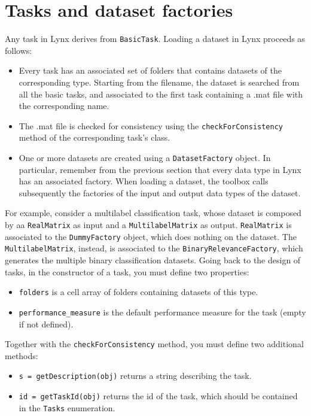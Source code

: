 \section{Tasks and dataset factories}

Any task in Lynx derives from \verb|BasicTask|. Loading a dataset in Lynx proceeds as follows:

\begin{itemize}
\item Every task has an associated set of folders that contains datasets of the corresponding type. Starting from the filename, the dataset is searched from all the basic tasks, and associated to the first task containing a .mat file with the corresponding name.
\item The .mat file is checked for consistency using the \verb|checkForConsistency| method of the corresponding task's class.
\item One or more datasets are created using a \verb|DatasetFactory| object. In particular, remember from the previous section that every data type in Lynx has an associated factory. When loading a dataset, the toolbox calls subsequently the factories of the input and output data types of the dataset.
\end{itemize}

\noindent For example, consider a multilabel classification task, whose dataset is composed by aa \verb|RealMatrix| as input and a \verb|MultilabelMatrix| as output. \verb|RealMatrix| is associated to the \verb|DummyFactory| object, which does nothing on the dataset. The \verb|MultilabelMatrix|, instead, is associated to the \verb|BinaryRelevanceFactory|, which generates the multiple binary classification datasets. Going back to the design of tasks, in the constructor of a task, you must define two properties:

\begin{itemize}
\item \verb|folders| is a cell array of folders containing datasets of this type.
\item \verb|performance_measure| is the default performance measure for the task (empty if not defined).
\end{itemize}

\noindent Together with the \verb|checkForConsistency| method, you must define two additional methods:

\begin{itemize}
\item \verb|s = getDescription(obj)| returns a string describing the task.
\item \verb|id = getTaskId(obj)| returns the id of the task, which should be contained in the \verb|Tasks| enumeration.
\end{itemize}


